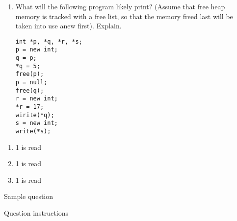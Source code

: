 \documentclass[11pt]{exam}
\begin{document}
\begin{questions}
\begin{enumerate}[label=(\roman*)]
            \item What will the following program likely print? (Assume that free heap memory is tracked with a free list, so that the memory freed last will be taken into use anew first). Explain.
\begin{lstlisting}
int *p, *q, *r, *s;
p = new int;
q = p;
*q = 5;
free(p);
p = null;
free(q);
r = new int;
*r = 17;
wirite(*q);
s = new int;
write(*s);
\end{lstlisting}
        \end{enumerate}

	\begin{framed}


	\end{framed}

        \begin{enumerate}[label=(\roman*)]
            \item 1 is read
                \begin{framed}
                \end{framed}
            \item 1 is read
                \begin{framed}
                \end{framed}
            \item 1 is read
                \begin{framed}
                \end{framed}
        \end{enumerate}


	\question Sample question


	\quad

	Question instructions

	\begin{framed}

	\end{framed}

\end{questions}
\end{document}
